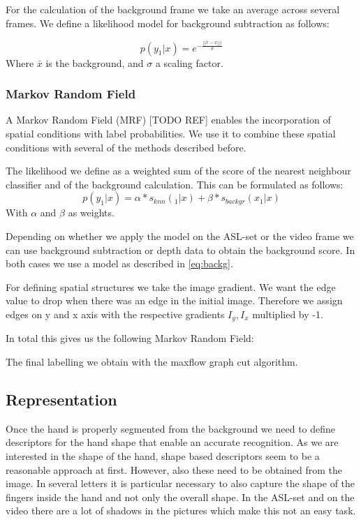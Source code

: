\documentclass[letterpaper, 10 pt, conference]{ieeeconf}  %
\begin{document}
For the calculation of the background frame we take an average across several frames. We define a likelihood model for background subtraction as follows:

\begin{equation}
p(y_1 | x) = e^{-\frac{||\bar{x}-x||)}{\sigma}}
\label{eq:backg}
\end{equation}
Where $\bar{x}$ is the background, and $\sigma$ a scaling factor. 

\subsubsection{Markov Random Field}

A Markov Random Field (MRF) [TODO REF] enables the incorporation of spatial conditions with label probabilities. We use it to combine these spatial conditions with several of the methods described before.

The likelihood we define as a weighted sum of the score of the nearest neighbour classifier and of the background calculation. This can be formulated as follows:
\begin{equation}
p(y_1 | x) = \alpha * s_{knn}(_1 | x) + \beta * s_{backgr}(x_1 | x) 
\end{equation}
With $\alpha$ and $\beta$ as weights.

Depending on whether we apply the model on the ASL-set or the video frame we can use background subtraction or depth data to obtain the background score. In both cases we use a model as described in \autoref{eq:backg}.

For defining spatial structures we take the image gradient. We want the edge value to drop when there was an edge in the initial image. Therefore we assign edges on y and x axis with the respective gradients $I_y, I_x$ multiplied by -1.

In total this gives us the following Markov Random Field:
\begin{center}



\end{center}

The final labelling we obtain with the maxflow graph cut algorithm.


\subsection{Representation}

Once the hand is properly segmented from the background we need to define descriptors for the hand shape that enable an accurate recognition. As we are interested in the shape of the hand, shape based descriptors seem to be a reasonable approach at first. However, also these need to be obtained from the image. In several letters it is particular necessary to also capture the shape of the fingers inside the hand and not only the overall shape. In the ASL-set and on the video there are a lot of shadows in the pictures which make this not an easy task.
\end{document}
